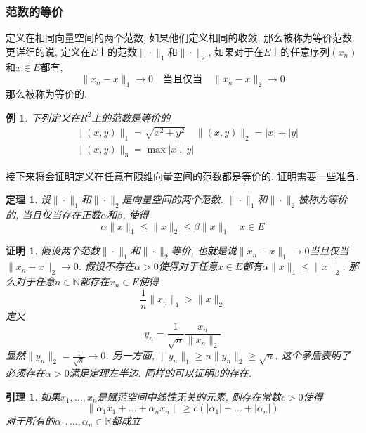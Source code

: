\documentclass[a4paper,11pt]{article}
\theoremstyle{mystyle}
\newtheorem{theorem}{\hspace{2em}定理}[section]
\newtheorem{lemma}{\hspace{2em}引理}[section]
\newtheorem{Proof}{\hspace{2em}证明}[section]
\newtheorem{example}{\hspace{2em}例}[section]
\begin{document}
\subsubsection*{范数的等价}
\begin{definition}
  定义在相同向量空间的两个范数, 如果他们定义相同的收敛, 那么被称为等价范数. 更详细的说, 定义在$E$上的范数$\|\cdot\|_1$和$\|\cdot\|_2$, 如果对于在$E$上的任意序列$(x_n)$和$x\in E$都有,
  \begin{equation*}
    \|x_n-x\|_1\to 0 \quad \text{当且仅当}\quad \|x_n-x\|_2\to 0
  \end{equation*}
  那么被称为等价的.
\end{definition}
\begin{example}
  下列定义在$R^2$上的范数是等价的
  \begin{equation*}
  \begin{split}
       &\|(x,y)\|_1=\sqrt{x^2+y^2}\quad \|(x,y)\|_2=|x|+|y| \\
       &\|(x,y)\|_3=\max{|x|,|y|}
  \end{split}
  \end{equation*}
\end{example}
接下来将会证明定义在任意有限维向量空间的范数都是等价的. 证明需要一些准备.
\begin{theorem}\label{norm equivalence}
  设$\|\cdot\|_1$和$\|\cdot\|_2$是向量空间的两个范数. $\|\cdot\|_1$和$\|\cdot\|_2$被称为等价的, 当且仅当存在正数$\alpha$和$\beta$, 使得
  \begin{equation*}
    \alpha\|x\|_1\leq\|x\|_2\leq\beta\|x\|_1\quad x\in E
  \end{equation*}
\end{theorem}
\begin{Proof}
  假设两个范数$\|\cdot\|_1$和$\|\cdot\|_2$等价, 也就是说$\|x_n-x\|_1\to 0$当且仅当$\|x_n-x\|_2\to 0$. 假设不存在$\alpha>0$使得对于任意$x\in E$都有$\alpha\|x\|_1\leq\|x\|_2$. 那么对于任意$n\in \mathbb{N}$都存在$x_n\in E$使得
  \begin{equation*}
    \frac{1}{n}\|x_n\|_1>\|x\|_2
  \end{equation*}
  定义
  \begin{equation*}
    y_n=\frac{1}{\sqrt{n}}\frac{x_n}{\|x_n\|_2}
  \end{equation*}
  显然$\|y_n\|_2=\frac{1}{\sqrt{n}}\to 0$. 另一方面, $\|y_n\|_1\geq n\|y_n\|_2\geq \sqrt{n}$. 这个矛盾表明了必须存在$\alpha>0$满足定理左半边. 同样的可以证明$\beta$的存在.
\end{Proof}
\begin{lemma}\label{norm Lemma}
  如果$x_1,\dots,x_n$是赋范空间中线性无关的元素, 则存在常数$c>0$使得
  \begin{equation}\label{norm lemma}
    \|\alpha_1x_1+\dots+\alpha_nx_n\|\geq c(|\alpha_1|+\dots+|\alpha_n|)
  \end{equation}
  对于所有的$\alpha_1,\dots,\alpha_n\in\mathbb{R}$都成立
\end{lemma}
\end{document}
